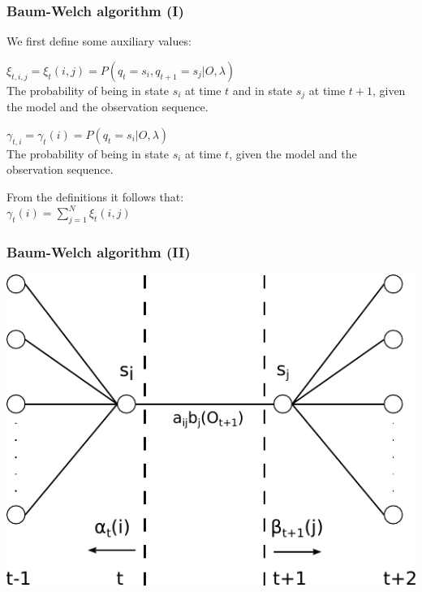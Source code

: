 \begin{frame}[t]
	\frametitle{Baum-Welch algorithm (I)}
	\pause
	We first define some auxiliary values:
	
	\begin{block}{}    
    	$\xi_{t,i,j} = \xi_t(i,j) = P(q_t=s_i,q_{t+1}=s_j \vert O, \lambda)$\\
    	The probability of being in state $s_i$ at time $t$ and in state $s_j$ at time $t+1$, given
    	the model and the observation sequence.
	\end{block}
	\pause
	
	\begin{block}{}    
    	$ \gamma_{t,i} = \gamma_t(i) = P(q_t = s_i \vert O, \lambda)$\\
    	The probability of being in state $s_i$ at time $t$, given the model and the observation sequence.
	\end{block}
	\vspace*{1em}
	\pause
	
	From the definitions it follows that:\\
	$ \gamma_t(i) = \displaystyle\sum_{j=1}^{N}\xi_t(i,j)$
  	
\end{frame}

\begin{frame}[t]
	\frametitle{Baum-Welch algorithm (II)}
	\includegraphics[height=0.35\textheight]{images/baum-welch-alg.pdf}
  	
\end{frame}